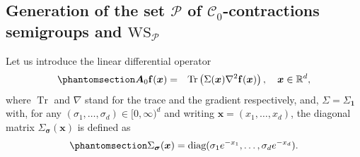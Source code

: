 \documentclass[12pt]{amsart}
\newcommand{\hlabel}{\phantomsection\label}
\numberwithin{equation}{section}
\newcommand{\bb}{\mathbb}
\newcommand{\ccP}{\mathscr{P}}
\newcommand{\tg}{}
\newcommand{\tr}{\operatorname{Tr}}
\newcommand{\nab}{\nabla}
\newcommand{\ttt}{\mathtt}
\newcommand{\C}{\mathbf{C}}
\newcommand{\f}{\mathbf{f}}
\theoremstyle{definition}
\theoremstyle{assump}
\theoremstyle{remark}
\begin{document}
\subsection{Generation of the set  $\ccP$ of $\mathcal{C}_0$-contractions semigroups and $\mathrm{WS}_\ccP$}
Let us  introduce the linear differential operator
\begin{eqnarray}\hlabel{eq:fourier_int_0}
	\bm{A}_0\f(\bm{x})&=&\tr\left(\Sigma(\bm{x})\nab^2 \f(\bm{x})\right), \quad  \bm{x} \in \bb{R}^d,
\end{eqnarray}
where $\tr$ and $\nab$ stand for the trace and  the gradient respectively, and, $\Sigma=\Sigma_{\bm{1}}$ with, for any $(\sigma_1,\ldots, \sigma_d)\in [0,\infty)^d$ and writing $\bm{x}=(x_1,\ldots,x_d)$, the diagonal matrix $\Sigma_{\bm{\sigma}}(\bm{x})$ is defined as
\begin{align} \hlabel{eq:defQ}
	\Sigma_{\bm{\sigma}}(\bm{x})=\textrm{diag}(
		\sigma_1e^{-x_1}, \ldots, \sigma_de^{-x_d}).
\end{align}
\end{document}
